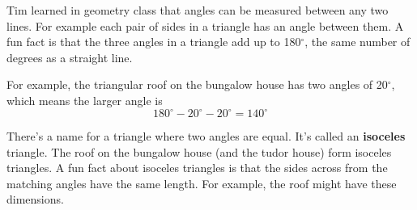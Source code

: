 Tim learned in geometry class that angles can be measured between any two lines.  For example each pair of sides in a triangle has an angle between them.  A fun fact is that the three angles in a triangle add up to 180$^\circ$, the same number of degrees as a straight line.

For example, the triangular roof on the bungalow house has two angles of 20$^\circ$, which means the larger angle is $$180^\circ-20^\circ-20^\circ=140^\circ$$

\begin{center}
\end{center}

There's a name for a triangle where two angles are equal.  It's called an \textbf{isoceles} triangle.  The roof on the bungalow house (and the tudor house) form isoceles triangles.  A fun fact about isoceles triangles is that the sides across from the matching angles have the same length.  For example, the roof might have these dimensions.

\begin{center}
\end{center}

